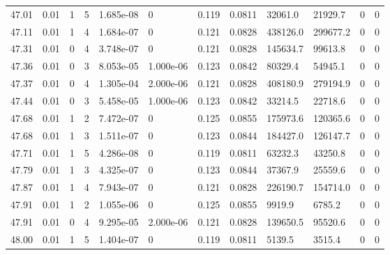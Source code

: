 \documentclass[preview]{standalone}
\begin{document}
{{{{{{{{{{{{{\begin{tabular}{L{1.2cm}C{1.2cm} C{0.3cm}C{0.5cm} C{1.4cm}C{1.4cm} C{1.4cm}C{1.4cm} C{1.6cm}C{1.6cm} C{1.6cm}C{1.6cm}}
  47.01  &  0.01  & 1     &  5 &  1.685e-08  & 0  &  0.119&   0.0811& 32061.0 & 21929.7   &  0 & 0  \\ 
  47.11  &  0.01  & 1     &  4 &  1.684e-07  & 0  &  0.121&   0.0828& 438126.0 & 299677.2   &  0 & 0  \\ 
  47.31  &  0.01  & 0     &  4 &  3.748e-07  & 0  &  0.121&   0.0828& 145634.7 & 99613.8   &  0 & 0  \\ 
  47.36  &  0.01  & 0     &  3 &  8.053e-05  & 1.000e-06  &  0.123&   0.0842& 80329.4 & 54945.1   &  0 & 0  \\ 
  47.37  &  0.01  & 0     &  4 &  1.305e-04  & 2.000e-06  &  0.121&   0.0828& 408180.9 & 279194.9   &  0 & 0  \\ 
  47.44  &  0.01  & 0     &  3 &  5.458e-05  & 1.000e-06  &  0.123&   0.0842& 33214.5 & 22718.6   &  0 & 0  \\ 
  47.68  &  0.01  & 1     &  2 &  7.472e-07  & 0  &  0.125&   0.0855& 175973.6 & 120365.6   &  0 & 0  \\ 
  47.68  &  0.01  & 1     &  3 &  1.511e-07  & 0  &  0.123&   0.0844& 184427.0 & 126147.7   &  0 & 0  \\ 
  47.71  &  0.01  & 1     &  5 &  4.286e-08  & 0  &  0.119&   0.0811& 63232.3 & 43250.8   &  0 & 0  \\ 
  47.79  &  0.01  & 1     &  3 &  4.325e-07  & 0  &  0.123&   0.0844& 37367.9 & 25559.6   &  0 & 0  \\ 
  47.87  &  0.01  & 1     &  4 &  7.943e-07  & 0  &  0.121&   0.0828& 226190.7 & 154714.0   &  0 & 0  \\ 
  47.91  &  0.01  & 1     &  2 &  1.055e-06  & 0  &  0.125&   0.0855& 9919.9 & 6785.2   &  0 & 0  \\ 
  47.91  &  0.01  & 0     &  4 &  9.295e-05  & 2.000e-06  &  0.121&   0.0828& 139650.5 & 95520.6   &  0 & 0  \\ 
  48.00  &  0.01  & 1     &  5 &  1.404e-07  & 0  &  0.119&   0.0811& 5139.5 & 3515.4   &  0 & 0  \\ 
\hline 
\end{tabular} 

}}}}}}}}}}}}}
\end{document}

